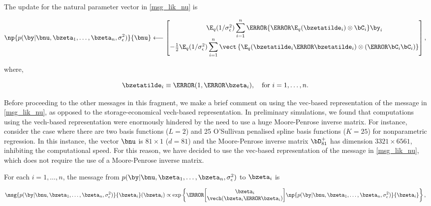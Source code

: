 \documentclass[12pt]{article}
\def\sigsqeps{\sigma^2_{\epsilon}}
\theoremstyle{plain}
\theoremstyle{definition}
\theoremstyle{remark}
\begin{document}
\noindent The update for the natural parameter vector in \eqref{msg_lik_nu} is

\begin{equation}
	\np{p (\by | \bnu, \bzeta_1, \dots, \bzeta_n, \sigsqeps)}{\bnu}
		\longleftarrow
			\begin{bmatrix}
				\E_q (1/\sigsqeps) \displaystyle\sum_{i=1}^n \T{\left\{
					\T{\E_q (\bzetatilde_i)} \otimes \bC_i
				\right\}} \by_i \\
				-\frac12 \E_q (1/\sigsqeps) \displaystyle\sum_{i=1}^n \vect \left\{
					\E_q (\bzetatilde_i \T{\bzetatilde_i}) \otimes (\T{\bC_i} \bC_i)
				\right\}
			\end{bmatrix},
\label{np_lik_nu}
\end{equation}

\noindent where, 

\begin{equation}
	\bzetatilde_i \equiv \T{(1, \T{\bzeta_i})}, \quad \text{for $i = 1, \dots, n$.}
\label{zeta_tilde}
\end{equation}

\noindent Before proceeding to the other messages in this fragment, we make a brief comment on using the vec-based
representation of the message in \eqref{msg_lik_nu}, as opposed to the storage-economical vech-based representation.
In preliminary simulations, we found that computations using the vech-based representation were enormously hindered
by the need to use a huge Moore-Penrose inverse matrix. For instance, consider the case where
there are two basis functions ($L = 2$) and 25 O'Sullivan penalised spline basis functions ($K = 25$) for nonparametric
regression. In this instance, the vector $\bnu$ is $81 \times 1$ ($d = 81$) and the Moore-Penrose inverse matrix
$\bD_{81}^+$ has dimension $3321 \times 6561$, inhibiting the computational speed. For this reason, we have
decided to use the vec-based representation of the message in \eqref{msg_lik_nu}, which does not require the
use of a Moore-Penrose inverse matrix.

For each $i = 1, \dots, n$, the message from $p (\by | \bnu, \bzeta_1, \dots, \bzeta_n, \sigsqeps)$ to $\bzeta_i$ is

\begin{equation}
	\msg{p (\by | \bnu, \bzeta_1, \dots, \bzeta_n, \sigsqeps)}{\bzeta_i} (\bzeta_i) \propto
		\exp \left\{
			\T{\begin{bmatrix}
				\bzeta_i \\
				\vech (\bzeta_i \T{\bzeta_i})
			\end{bmatrix}}
			\np{p (\by | \bnu, \bzeta_1, \dots, \bzeta_n, \sigsqeps)}{\bzeta_i}
		\right\},
\label{msg_lik_zeta}
\end{equation}
\end{document}
